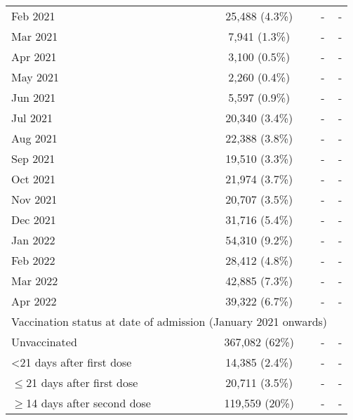 \begin{longtable}[t]{lccc}
\hspace{1em}Feb 2021 & 25,488 (4.3\%) & - & -\\
\hspace{1em}Mar 2021 & 7,941 (1.3\%) & - & -\\
\hspace{1em}Apr 2021 & 3,100 (0.5\%) & - & -\\
\hspace{1em}May 2021 & 2,260 (0.4\%) & - & -\\
\hspace{1em}Jun 2021 & 5,597 (0.9\%) & - & -\\
\hspace{1em}Jul 2021 & 20,340 (3.4\%) & - & -\\
\hspace{1em}Aug 2021 & 22,388 (3.8\%) & - & -\\
\hspace{1em}Sep 2021 & 19,510 (3.3\%) & - & -\\
\hspace{1em}Oct 2021 & 21,974 (3.7\%) & - & -\\
\hspace{1em}Nov 2021 & 20,707 (3.5\%) & - & -\\
\hspace{1em}Dec 2021 & 31,716 (5.4\%) & - & -\\
\hspace{1em}Jan 2022 & 54,310 (9.2\%) & - & -\\
\hspace{1em}Feb 2022 & 28,412 (4.8\%) & - & -\\
\hspace{1em}Mar 2022 & 42,885 (7.3\%) & - & -\\
\hspace{1em}Apr 2022 & 39,322 (6.7\%) & - & -\\
\multicolumn{3}{l}{Vaccination status at date of admission (January 2021 onwards)}  & \\
\hspace{1em}Unvaccinated & 367,082 (62\%) & - & -\\
\hspace{1em}<21 days after first dose & 14,385 (2.4\%) & - & -\\
\hspace{1em}$\leq$21 days after first dose & 20,711 (3.5\%) & - & -\\
\hspace{1em}$\geq$14 days after second dose & 119,559 (20\%) & - & -\\

\end{longtable}
